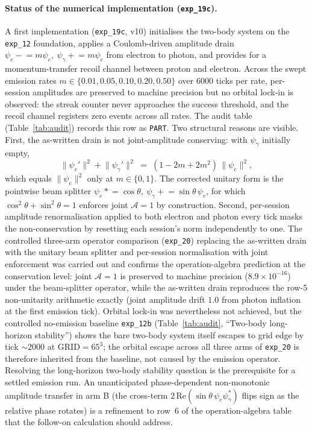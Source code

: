 \paragraph{Status of the numerical implementation (\texttt{exp\_19c}).}
A first implementation (\texttt{exp\_19c}, v10) initialises the two-body
system on the \texttt{exp\_12} foundation, applies a Coulomb-driven
amplitude drain
$\psi_e \mathrel{-}\!= m\psi_e,\ \psi_\gamma \mathrel{+}\!= m\psi_e$
from electron to photon, and provides for a momentum-transfer recoil
channel between proton and electron.  Across the swept emission rates
$m \in \{0.01, 0.05, 0.10, 0.20, 0.50\}$ over $6000$ ticks per rate,
per-session amplitudes are preserved to machine precision but no
orbital lock-in is observed: the streak counter never approaches the
success threshold, and the recoil channel registers zero events across
all rates.  The audit table (Table~\ref{tab:audit}) records this row
as \texttt{PART}.  Two structural reasons are visible.  First, the
as-written drain is not joint-amplitude conserving: with $\psi_\gamma$
initially empty,
\begin{equation*}
  \lVert\psi_e'\rVert^2 + \lVert\psi_\gamma'\rVert^2
    \;=\; (1 - 2m + 2m^2)\,\lVert\psi_e\rVert^2,
\end{equation*}
which equals $\lVert\psi_e\rVert^2$ only at $m \in \{0, 1\}$.  The
corrected unitary form is the pointwise beam splitter
$\psi_e \mathrel{*}\!= \cos\theta,\ \psi_\gamma \mathrel{+}\!= \sin\theta\,\psi_e$,
for which $\cos^2\theta + \sin^2\theta = 1$ enforces joint
$\mathcal{A}=1$ by construction.  Second, per-session amplitude
renormalisation applied to both electron and photon every tick masks
the non-conservation by resetting each session's norm independently to
one.  The controlled three-arm operator comparison (\texttt{exp\_20})
replacing the as-written drain with the unitary beam splitter and
per-session normalisation with joint enforcement was carried out and
confirms the operation-algebra prediction at the conservation level:
joint $\mathcal{A}=1$ is preserved to machine precision
($8.9\!\times\!10^{-16}$) under the beam-splitter operator, while the
as-written drain reproduces the row-5 non-unitarity arithmetic
exactly (joint amplitude drift $1.0$ from photon inflation at the
first emission tick).  Orbital lock-in was nevertheless not
achieved, but the controlled no-emission baseline \texttt{exp\_12b}
(Table~\ref{tab:audit}, ``Two-body long-horizon stability'') shows
the bare two-body system itself escapes to grid edge by tick $\sim
2000$ at $\text{GRID} = 65^3$; the orbital escape across all three
arms of \texttt{exp\_20} is therefore inherited from the baseline,
not caused by the emission operator.  Resolving the long-horizon
two-body stability question is the prerequisite for a settled
emission run.  An unanticipated phase-dependent non-monotonic
amplitude transfer in arm B (the cross-term
$2\,\mathrm{Re}(\sin\theta\,\psi_e \psi_\gamma^*)$ flips sign as the
relative phase rotates) is a refinement to row~6 of the
operation-algebra table that the follow-on calculation should
address.

